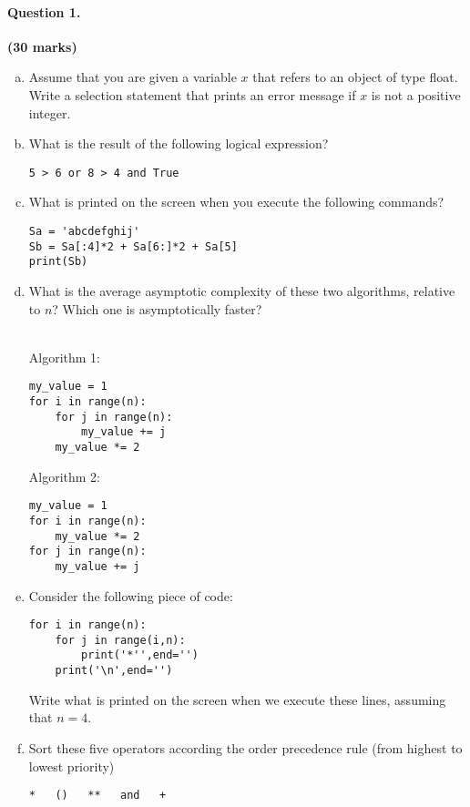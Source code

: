 \documentclass[12pt]{article}
\begin{document}
\paragraph{Question 1.}\hfill {\bf (30 marks)}
\begin{enumerate}[(a)]
\item Assume that you are given a variable $x$ that refers to an object of type float. Write a selection statement that prints an error message if $x$ is not a positive integer.
\item What is the result of the following logical expression?
\begin{verbatim}
5 > 6 or 8 > 4 and True
\end{verbatim}
\item What is printed on the screen when you execute the following commands?
\begin{verbatim}
Sa = 'abcdefghij'
Sb = Sa[:4]*2 + Sa[6:]*2 + Sa[5]
print(Sb)
\end{verbatim}
\item What is the average asymptotic complexity of these two algorithms, relative to $n$? Which one is asymptotically faster?\\\\
\begin{minipage}[t]{0.45\textwidth}
Algorithm 1:
\begin{verbatim}
my_value = 1
for i in range(n):
    for j in range(n):
        my_value += j
    my_value *= 2
\end{verbatim}
\end{minipage}
\begin{minipage}[t]{0.45\textwidth}
Algorithm 2:
\begin{verbatim}
my_value = 1
for i in range(n):
    my_value *= 2
for j in range(n):
    my_value += j
\end{verbatim}
\end{minipage}
\item Consider the following piece of code:
\begin{verbatim}
for i in range(n):
    for j in range(i,n):
        print('*'',end='')
    print('\n',end='')
\end{verbatim}
Write what is printed on the screen when we execute these lines, assuming that $n=4$.
\item Sort these five operators according the order precedence rule (from highest to lowest priority)
\begin{verbatim}
*   ()   **   and   +
\end{verbatim}
\end{enumerate}
\end{document}
